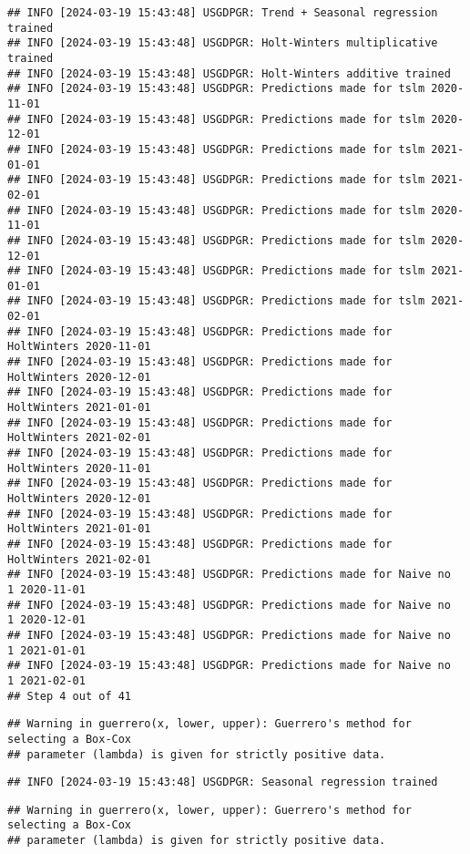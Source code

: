 \documentclass[
]{article}
\begin{document}
\begin{verbatim}
## INFO [2024-03-19 15:43:48] USGDPGR: Trend + Seasonal regression trained
## INFO [2024-03-19 15:43:48] USGDPGR: Holt-Winters multiplicative trained
## INFO [2024-03-19 15:43:48] USGDPGR: Holt-Winters additive trained
## INFO [2024-03-19 15:43:48] USGDPGR: Predictions made for tslm 2020-11-01
## INFO [2024-03-19 15:43:48] USGDPGR: Predictions made for tslm 2020-12-01
## INFO [2024-03-19 15:43:48] USGDPGR: Predictions made for tslm 2021-01-01
## INFO [2024-03-19 15:43:48] USGDPGR: Predictions made for tslm 2021-02-01
## INFO [2024-03-19 15:43:48] USGDPGR: Predictions made for tslm 2020-11-01
## INFO [2024-03-19 15:43:48] USGDPGR: Predictions made for tslm 2020-12-01
## INFO [2024-03-19 15:43:48] USGDPGR: Predictions made for tslm 2021-01-01
## INFO [2024-03-19 15:43:48] USGDPGR: Predictions made for tslm 2021-02-01
## INFO [2024-03-19 15:43:48] USGDPGR: Predictions made for HoltWinters 2020-11-01
## INFO [2024-03-19 15:43:48] USGDPGR: Predictions made for HoltWinters 2020-12-01
## INFO [2024-03-19 15:43:48] USGDPGR: Predictions made for HoltWinters 2021-01-01
## INFO [2024-03-19 15:43:48] USGDPGR: Predictions made for HoltWinters 2021-02-01
## INFO [2024-03-19 15:43:48] USGDPGR: Predictions made for HoltWinters 2020-11-01
## INFO [2024-03-19 15:43:48] USGDPGR: Predictions made for HoltWinters 2020-12-01
## INFO [2024-03-19 15:43:48] USGDPGR: Predictions made for HoltWinters 2021-01-01
## INFO [2024-03-19 15:43:48] USGDPGR: Predictions made for HoltWinters 2021-02-01
## INFO [2024-03-19 15:43:48] USGDPGR: Predictions made for Naive no  1 2020-11-01
## INFO [2024-03-19 15:43:48] USGDPGR: Predictions made for Naive no  1 2020-12-01
## INFO [2024-03-19 15:43:48] USGDPGR: Predictions made for Naive no  1 2021-01-01
## INFO [2024-03-19 15:43:48] USGDPGR: Predictions made for Naive no  1 2021-02-01
## Step 4 out of 41
\end{verbatim}

\begin{verbatim}
## Warning in guerrero(x, lower, upper): Guerrero's method for selecting a Box-Cox
## parameter (lambda) is given for strictly positive data.
\end{verbatim}

\begin{verbatim}
## INFO [2024-03-19 15:43:48] USGDPGR: Seasonal regression trained
\end{verbatim}

\begin{verbatim}
## Warning in guerrero(x, lower, upper): Guerrero's method for selecting a Box-Cox
## parameter (lambda) is given for strictly positive data.
\end{verbatim}
\end{document}
